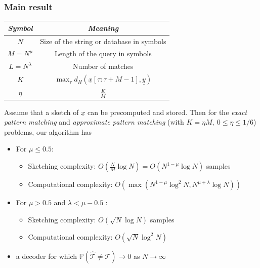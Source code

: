 \documentclass[10pt,xcolor=table]{beamer}
\newcommand{\mbb}{\mathbb}
\newcommand{\xv}{\underline{x}}
\newcommand{\yv}{\underline{y}}
\begin{document}
\begin{frame} \frametitle{Main result}
	
	{\small
		\begin{table}[h!]
			\begin{center}
				\begin{tabular}{|c|c|} 	
					\hline		
					\textit{Symbol}		&  \textit{Meaning} \\		
					\hline
					$N$           		& Size of the string or database in symbols \\
					\hline
					$M = N^{\mu}$       & Length of the query in symbols \\
					\hline
					$L = N^\lambda$    &   Number of matches \\
					\hline
					$K$             &$\max_{\tau}d_{H}(\xv[\tau:\tau+M-1],\yv)$\\
					\hline
					$\eta$             &$\frac{K}{M}$\\
					\hline
				\end{tabular}
			\end{center}
		\end{table}
	}	
	
	\vspace{-2.5mm}
	\begin{theorem}
		Assume that a sketch of $\xv$ can be precomputed and stored. Then for the {\it exact pattern matching} and {\it approximate pattern matching} (with $K = \eta M,~ 0 \leq \eta \leq 1/6$) problems, our algorithm has
		\begin{itemize}
		 \item	For $\mu \leq 0.5:$
		\begin{itemize}
			\item \alert{Sketching complexity:}
			{\color{blue} $O(\frac{N}{M}\log N)=O(N^{1-\mu}\log N)$} \alert{samples}
			\item \alert{Computational complexity:}
			{\color{blue}$O(\max(N^{1-\mu}\log^2 N, N^{\mu+\lambda}\log N ))$}
		\end{itemize}	
        \pause
		\item	For $\mu > 0.5$ and $\lambda<\mu-0.5$ :
		\begin{itemize}
			\item \alert{Sketching complexity:}
			{\color{blue} $O(\sqrt{N}\log N)$} samples
			\item \alert{Computational complexity:}
			{\color{blue}$O(\sqrt{N}\log^2 N)$}
		\end{itemize}	
        \pause				 		
		\item a decoder for which $\mbb{P}(\hat{{\mathcal{T}}} \neq \mathcal{T}) \rightarrow 0$ as $N \rightarrow \infty$
		\end{itemize}
	\end{theorem}
\end{frame}
\end{document}
